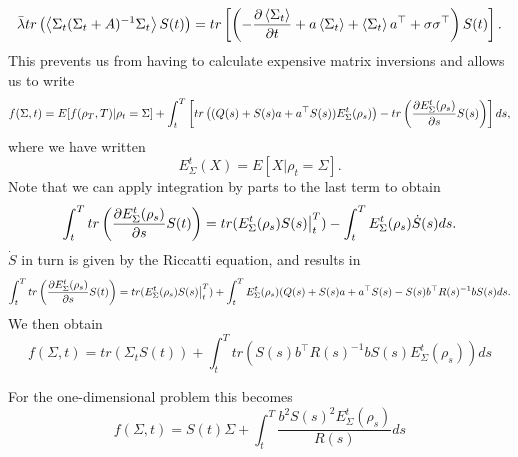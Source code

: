 \[
\bar{\lambda} tr\left(\left<\Sigma_t(\Sigma_t + A)^{-1} \Sigma_t\right>S(t)\right) = tr\left[\left(-\frac{\partial \left<\Sigma_t\right>}{\partial t} + a \left<\Sigma_t\right> + \left<\Sigma_t\right> a^\top + \sigma\sigma^\top\right)S(t)\right]. 
\]
This prevents us from having to calculate expensive matrix inversions and allows us to write
\[
f(\Sigma,t) =E[f(\rho_T,T)|\rho_t=\Sigma] + \int_t^T\left[ tr\left((Q(s)+S(s)a + a^\top S(s))E^t_{\Sigma}(\rho_s)\right)-tr\left( \frac{\partial E^t_\Sigma(\rho_s)}{\partial s} S(s)\right)\right]ds,
\]
where we have written
\[
E^t_\Sigma(X) = E[X|\rho_t=\Sigma].
\]
Note that we can apply integration by parts to the last term to obtain
\[
\int_t^T tr\left( \frac{\partial E^t_\Sigma(\rho_s)}{\partial s} S(t)\right) = tr(E^t_\Sigma(\rho_s) S(s)\big|_t^T) - \int_t^T E^t_\Sigma(\rho_s) \dot{S}(s)ds.
\]
$\dot{S}$ in turn is given by the Riccatti equation, and results in
\[
\int_t^T tr\left( \frac{\partial E^t_\Sigma(\rho_s)}{\partial s} S(t)\right) =  tr(E^t_\Sigma(\rho_s) S(s)\big|_t^T) + \int_t^T E^t_\Sigma(\rho_s) (Q(s) + S(s) a + a^\top S(s) -S(s) b^\top R(s)^{-1} b S(s)ds.
\]
We then obtain
\[
f(\Sigma,t)  = tr\left(\Sigma_t S(t)\right) + \int_t^T tr \left(S(s) b^\top R(s)^{-1}b S(s) E^t_\Sigma(\rho_s)\right) ds
\]

For the one-dimensional problem this becomes
\[
f(\Sigma,t) = S(t) \Sigma + \int_t^T \frac{b^2 S(s)^2 E^t_\Sigma(\rho_s)}{R(s)}ds 
\]

